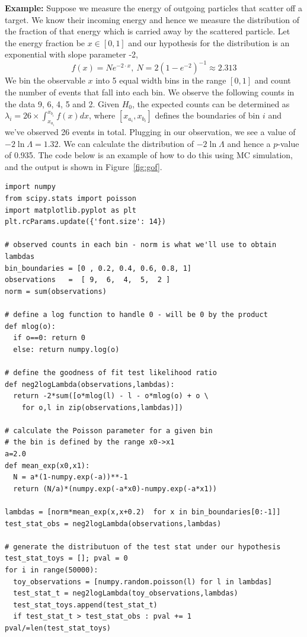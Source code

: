  \begin{tcolorbox}[colback=backblue]
\textbf{Example:} Suppose we measure the energy of outgoing particles that scatter off a target. We know their incoming energy and hence we measure the distribution of the fraction of that energy which is carried away by the scattered particle. Let the energy fraction be $x\in[0,1]$ and our hypothesis for the distribution is an exponential with slope parameter -2, 
\begin{equation}
f(x)=Ne^{-2\cdot x}, ~N=2(1-e^{-2})^{-1} \approx 2.313
\end{equation}
We bin the observable $x$ into 5 equal width bins in the range $[0,1]$ and count the number of events that fall into each bin. We observe the following counts in the data 9,  6,  4,  5 and 2. Given $H_0$, the expected counts can be determined as $\lambda_{i}  =  26\times\int_{x_{a_{i}}}^{x_{b_{i}}}f(x)dx$, where $[x_{a_{i}},x_{b_{i}}]$ defines the boundaries of bin $i$ and we've observed 26 events in total.  Plugging in our observation, we see a value of $-2\ln\Lambda=1.32$. We can calculate the distribution of $-2\ln\Lambda$ and hence a $p$-value of 0.935. The code below is an example of how to do this using MC simulation, and the output is shown in Figure~\ref{fig:gof}.
\begin{lstlisting}[style = Python]
import numpy
from scipy.stats import poisson
import matplotlib.pyplot as plt
plt.rcParams.update({'font.size': 14})

# observed counts in each bin - norm is what we'll use to obtain lambdas
bin_boundaries = [0 , 0.2, 0.4, 0.6, 0.8, 1]
observations   =  [ 9,  6,  4,  5,  2 ]
norm = sum(observations)

# define a log function to handle 0 - will be 0 by the product
def mlog(o):
  if o==0: return 0
  else: return numpy.log(o)

# define the goodness of fit test likelihood ratio
def neg2logLambda(observations,lambdas):
  return -2*sum([o*mlog(l) - l - o*mlog(o) + o \
    for o,l in zip(observations,lambdas)])

# calculate the Poisson parameter for a given bin
# the bin is defined by the range x0->x1
a=2.0
def mean_exp(x0,x1):
  N = a*(1-numpy.exp(-a))**-1
  return (N/a)*(numpy.exp(-a*x0)-numpy.exp(-a*x1))

lambdas = [norm*mean_exp(x,x+0.2)  for x in bin_boundaries[0:-1]]
test_stat_obs = neg2logLambda(observations,lambdas)

# generate the distributuon of the test stat under our hypothesis
test_stat_toys = []; pval = 0
for i in range(50000):
  toy_observations = [numpy.random.poisson(l) for l in lambdas]
  test_stat_t = neg2logLambda(toy_observations,lambdas)
  test_stat_toys.append(test_stat_t)
  if test_stat_t > test_stat_obs : pval += 1
pval/=len(test_stat_toys)


\end{lstlisting}
\end{tcolorbox}
